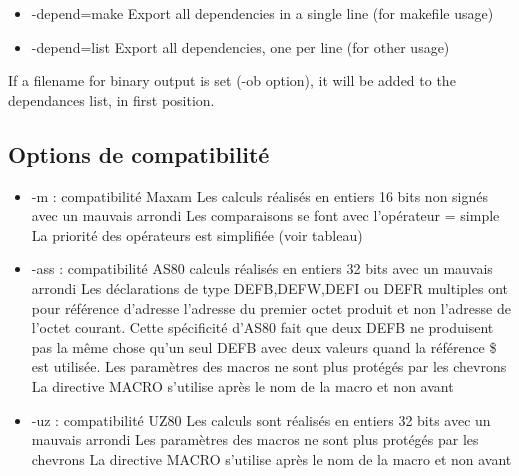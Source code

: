\begin{xen}
  \begin{itemize}
    \item -depend=make  Export all dependencies in a single line (for makefile usage)
    \item -depend=list  Export all dependencies, one per line (for other usage)
  \end{itemize}
  If a filename for binary output is set (-ob option), it will be added to the dependances list, in first position.
\end{xen}

\begin{xfr}
\subsection{Options de compatibilité}
\begin{itemize}
\item -m : compatibilité Maxam
 \subitem Les calculs réalisés en entiers 16 bits non signés avec un mauvais arrondi
 \subitem Les comparaisons se font avec l'opérateur = simple
 \subitem La priorité des opérateurs est simplifiée (voir tableau)

\item -ass : compatibilité AS80
 \subitem calculs réalisés en entiers 32 bits avec un mauvais arrondi
 \subitem Les déclarations de type DEFB,DEFW,DEFI ou DEFR multiples ont pour référence d'adresse l'adresse du premier octet produit et non l'adresse de l'octet courant. Cette spécificité d'AS80 fait que deux DEFB ne produisent pas la même chose qu'un seul DEFB avec deux valeurs quand la référence \$ est utilisée.
 \subitem Les paramètres des macros ne sont plus protégés par les chevrons {}
 \subitem La directive MACRO s'utilise après le nom de la macro et non avant

\item -uz : compatibilité UZ80
 \subitem Les calculs sont réalisés en entiers 32 bits avec un mauvais arrondi
 \subitem Les paramètres des macros ne sont plus protégés par les chevrons {}
 \subitem La directive MACRO s'utilise après le nom de la macro et non avant
\end{itemize}
\end{xfr}

